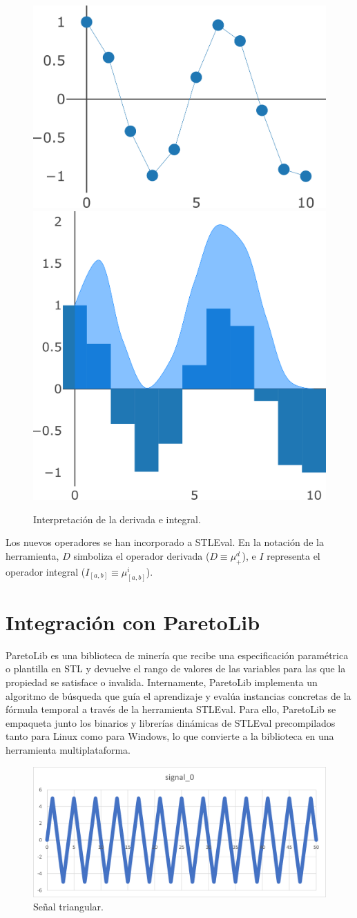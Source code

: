 \begin{figure}
\centering
  \includegraphics[width=.4\linewidth]{images/derivada} \hfill
  \includegraphics[width=.4\linewidth]{images/integral}
\caption{Interpretación de la derivada e integral.}
\label{fig:der_int}
\end{figure}

Los nuevos operadores se han incorporado a STLEval. En la notación de la herramienta, $D$ simboliza el operador derivada ($D \equiv \mu^d_{+}$), e $I$ representa el operador integral ($I_[a,b] \equiv \mu^i_{[a,b]}$).

\section{Integración con ParetoLib}
ParetoLib \cite{FORMATS_19, ParetoLib} es una biblioteca de minería que recibe una especificación paramétrica o plantilla en STL y devuelve el rango de valores de las variables para las que la propiedad se satisface o invalida. Internamente, ParetoLib implementa un algoritmo de búsqueda que guía el aprendizaje y evalúa instancias concretas de la fórmula temporal a través de la herramienta STLEval. Para ello, ParetoLib se empaqueta junto los binarios y librerías dinámicas de STLEval precompilados tanto para Linux como para Windows, lo que convierte a la biblioteca en una herramienta multiplataforma. 

\begin{figure}[htb]
\centering
  \includegraphics[width=0.7\linewidth]{images/triangular} 
\caption{Señal triangular.}
\label{fig:trian}
\end{figure}


